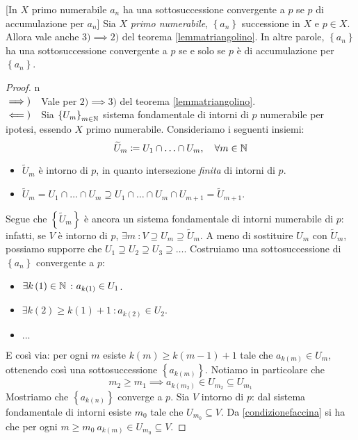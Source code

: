 \begin{lemma}{}[In $X$ primo numerabile $a_n$ ha una sottosuccessione convergente a $p$ se $p$ di accumulazione per $a_n$]\label{primonumesucc}
Sia $X$ \textit{primo numerabile}, $\left\{a_n\right\}$ successione in $X$ e $p\in X$. Allora vale anche $3)\implies 2)$ del teorema \ref{lemmatriangolino}. In altre parole, $\left\{a_n\right\}$ ha una sottosuccessione convergente a $p$ se e solo se $p$ è di accumulazione per $\left\{a_n\right\}$.
\end{lemma}
\begin{proof}{n}~{}\\
	$\implies)\quad$Vale per $2)\implies 3)$ del teorema \ref{lemmatriangolino}.\\
	$\impliedby)\quad$Sia $\left\{U_m\right\}_{m\in\mathbb{N}}$ sistema fondamentale di intorni di $p$ numerabile per ipotesi, essendo $X$ primo numerabile. Consideriamo i seguenti insiemi:
	\begin{equation*}
	\widetilde{U}_m\coloneqq U_1\cap\ldots \cap U_m,\quad \forall m\in \mathbb{N}
	\end{equation*}
\begin{itemize}
	\item $\widetilde{U}_m$ è intorno di $p$, in quanto intersezione \textit{finita} di intorni di $p$.
	\item $\widetilde{U}_m=U_1\cap\ldots\cap U_m\supseteq U_1\cap\ldots\cap U_m\cap U_{m+1}=\widetilde{U}_{m+1}$.
\end{itemize}
Segue che $\left\{\widetilde{U}_m\right\}$ è ancora un sistema fondamentale di intorni numerabile di $p$: infatti, se $V$ è intorno di $p$, $\exists m\ \colon V\supseteq U_m\supseteq \widetilde{U}_m$. A meno di sostituire $U_m$ con $\widetilde{U}_m$, possiamo supporre che $U_1\supseteq U_2\supseteq U_3\supseteq \ldots$. Costruiamo una sottosuccessione di $\left\{a_n\right\}$ convergente a $p$:
\begin{itemize}
	\item $\exists k\left(1\right)\in \mathbb{N}\ \colon a_{k\left(1\right)}\in U_1$.
	\item $\exists k\left(2\right)\geq k\left(1\right)+1\ \colon a_{k\left(2\right)}\in U_2$.
	\item $...$
\end{itemize}
E così via: per ogni $m$ esiste $k\left(m\right)\geq k\left(m-1\right)+1$ tale che $a_{k\left(m\right)}\in U_m$, ottenendo così una sottosuccessione $\left\{a_{k\left(m\right)}\right\}$. Notiamo in particolare che
\begin{equation}
	m_2\geq m_1\implies a_{k\left(m_2\right)}\in U_{m_2}\subseteq U_{m_1}\label{condizionefaccina}
\end{equation}
Mostriamo che $\left\{a_{k\left(n\right)}\right\}$ converge a $p$. Sia $V$ intorno di $p$: dal sistema fondamentale di intorni esiste $m_0$ tale che $U_{m_0}\subseteq V$. Da \eqref{condizionefaccina} si ha che per ogni $m\geq m_0\ a_{k\left(m\right)}\in U_{m_0}\subseteq V$.\qedhere
\end{proof}
